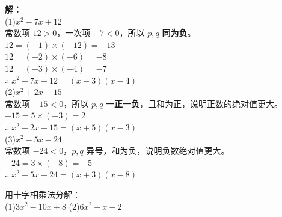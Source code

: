 \documentclass[12pt, a4paper]{ctexart}
\begin{document}
\textbf{解：}\\[3pt]
(1)\;$x^2 - 7x + 12$\\
常数项 $12 > 0$，一次项 $-7 < 0$，所以 $p, q$ \textbf{同为负}。\\
$12 = (-1)\times(-12)$ $= -13$ \quad \texttimes\\
$12 = (-2)\times(-6)$ $= -8$ \quad \texttimes\\
$12 = (-3)\times(-4)$ $= -7$ \quad \checkmark\\[3pt]
$\therefore\; x^2 - 7x + 12 = (x-3)(x-4)$\\[6pt]
(2)\;$x^2 + 2x - 15$\\
常数项 $-15 < 0$，所以 $p, q$ \textbf{一正一负}，且和为正，说明正数的绝对值更大。\\
$-15 = 5 \times (-3)$ $= 2$ \quad \checkmark\\[3pt]
$\therefore\; x^2 + 2x - 15 = (x+5)(x-3)$\\[6pt]
(3)\;$x^2 - 5x - 24$\\
常数项 $-24 < 0$，$p, q$ 异号，和为负，说明负数绝对值更大。\\
$-24 = 3 \times (-8)$ $= -5$ \quad \checkmark\\[3pt]
$\therefore\; x^2 - 5x - 24 = (x+3)(x-8)$

\begin{examplebox}
用十字相乘法分解：\\[3pt]
(1)\;$3x^2 - 10x + 8$ \qquad (2)\;$6x^2 + x - 2$
\end{examplebox}
\end{document}
